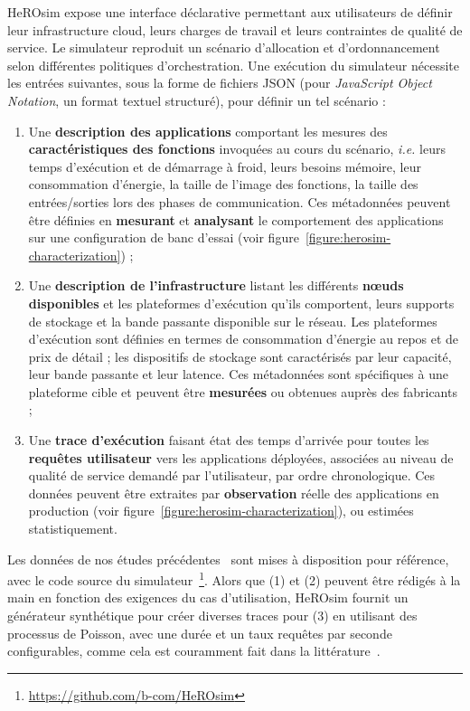 HeROsim expose une interface déclarative permettant aux utilisateurs de définir leur infrastructure cloud, leurs charges de travail et leurs contraintes de qualité de service. Le simulateur reproduit un scénario d'allocation et d'ordonnancement selon différentes politiques d'orchestration. Une exécution du simulateur nécessite les entrées suivantes, sous la forme de fichiers \gls{JSON} (pour \textit{JavaScript Object Notation}, un format textuel structuré), pour définir un tel scénario :

\begin{enumerate}
    \item Une \textbf{description des applications} comportant les mesures des \textbf{caractéristiques des fonctions} invoquées au cours du scénario, \textit{i.e.} leurs temps d'exécution et de démarrage à froid, leurs besoins mémoire, leur consommation d'énergie, la taille de l'image des fonctions, la taille des entrées/sorties lors des phases de communication. Ces métadonnées peuvent être définies en \textbf{mesurant} et \textbf{analysant} le comportement des applications sur une configuration de banc d'essai (voir figure~\ref{figure:herosim-characterization}) ;
    \item Une \textbf{description de l'infrastructure} listant les différents \textbf{nœuds disponibles} et les plateformes d'exécution qu'ils comportent, leurs supports de stockage et la bande passante disponible sur le réseau. Les plateformes d'exécution sont définies en termes de consommation d'énergie au repos et de prix de détail ; les dispositifs de stockage sont caractérisés par leur capacité, leur bande passante et leur latence. Ces métadonnées sont spécifiques à une plateforme cible et peuvent être \textbf{mesurées} ou obtenues auprès des fabricants ;
    \item Une \textbf{trace d'exécution} faisant état des temps d'arrivée pour toutes les \textbf{requêtes utilisateur} vers les applications déployées, associées au niveau de qualité de service demandé par l'utilisateur, par ordre chronologique. Ces données peuvent être extraites par \textbf{observation} réelle des applications en production (voir figure~\ref{figure:herosim-characterization}), ou estimées statistiquement.
\end{enumerate}


Les données de nos études précédentes~\cite{herofake, herocache} sont mises à disposition pour référence, avec le code source du simulateur~\footnote{\href{https://github.com/b-com/HeROsim}{https://github.com/b-com/HeROsim}}. Alors que (1) et (2) peuvent être rédigés à la main en fonction des exigences du cas d'utilisation, HeROsim fournit un générateur synthétique pour créer diverses traces pour (3) en utilisant des processus de Poisson, avec une durée et un taux requêtes par seconde configurables, comme cela est couramment fait dans la littérature~\cite{9928755}. 

